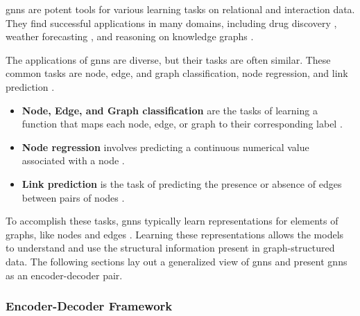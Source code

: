 
\glspl{gnn} are potent tools for various learning tasks on relational and interaction data. They find successful applications in many domains, including drug discovery \cite{dauparas_robust_2022}, weather forecasting \cite{lam_graphcast_2022}, and reasoning on knowledge graphs \cite{huang_few-shot_2022}. 

The applications of \glspl{gnn} are diverse, but their tasks are often similar. These common tasks are node, edge, and graph classification, node regression, and link prediction \cite{wu_comprehensive_2021, zhou_graph_2020}.
\begin{itemize}
    \item \textbf{Node, Edge, and Graph classification} are the tasks of learning a function that maps each node, edge, or graph to their corresponding label \cite{kipf_semi-supervised_2017}.
    \item \textbf{Node regression} involves predicting a continuous numerical value associated with a node \cite{wu_comprehensive_2021}.
    \item \textbf{Link prediction} is the task of predicting the presence or absence of edges between pairs of nodes \cite{liben-nowell_link-prediction_2007}.
\end{itemize}

To accomplish these tasks, \glspl{gnn} typically learn representations for elements of graphs, like nodes and edges \cite{zhou_graph_2020}. Learning these representations allows the models to understand and use the structural information present in graph-structured data. The following sections lay out a generalized view of \glspl{gnn} and present \glspl{gnn} as an encoder-decoder pair.

\subsubsection{Encoder-Decoder Framework}
\label{s_Background_GNNs_EncoderDecoderFramework}

